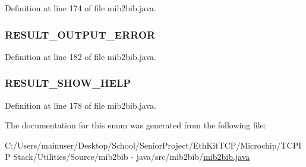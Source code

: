 Definition at line 174 of file mib2bib.\+java.

\hypertarget{enummib2bib_1_1mib2bib_1_1_p_r_o_g_r_a_m___r_e_s_u_l_t_a3d319bb21fffbe71cba6dcf8673046e5}{}
\subsubsection[{R\+E\+S\+U\+L\+T\+\_\+\+O\+U\+T\+P\+U\+T\+\_\+\+E\+R\+R\+O\+R}]{\setlength{\rightskip}{0pt plus 5cm}R\+E\+S\+U\+L\+T\+\_\+\+O\+U\+T\+P\+U\+T\+\_\+\+E\+R\+R\+O\+R}\label{enummib2bib_1_1mib2bib_1_1_p_r_o_g_r_a_m___r_e_s_u_l_t_a3d319bb21fffbe71cba6dcf8673046e5}


Definition at line 182 of file mib2bib.\+java.

\hypertarget{enummib2bib_1_1mib2bib_1_1_p_r_o_g_r_a_m___r_e_s_u_l_t_aada2fade94cff321d65d62212c878422}{}
\subsubsection[{R\+E\+S\+U\+L\+T\+\_\+\+S\+H\+O\+W\+\_\+\+H\+E\+L\+P}]{\setlength{\rightskip}{0pt plus 5cm}R\+E\+S\+U\+L\+T\+\_\+\+S\+H\+O\+W\+\_\+\+H\+E\+L\+P}\label{enummib2bib_1_1mib2bib_1_1_p_r_o_g_r_a_m___r_e_s_u_l_t_aada2fade94cff321d65d62212c878422}


Definition at line 178 of file mib2bib.\+java.



The documentation for this enum was generated from the following file\+:\begin{DoxyCompactItemize}
\item 
C\+:/\+Users/mainuser/\+Desktop/\+School/\+Senior\+Project/\+Eth\+Kit\+T\+C\+P/\+Microchip/\+T\+C\+P\+I\+P Stack/\+Utilities/\+Source/mib2bib -\/ java/src/mib2bib/\hyperlink{mib2bib_8java}{mib2bib.\+java}\end{DoxyCompactItemize}
